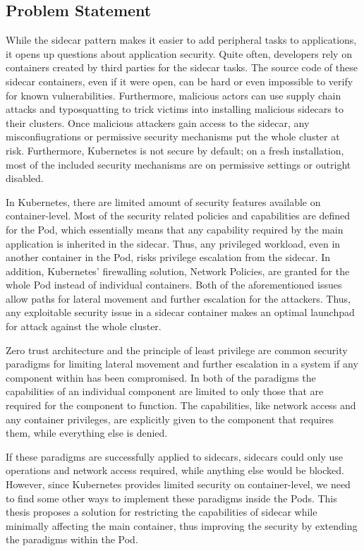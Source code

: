 \documentclass[english, 12pt, a4paper, sci, utf8, a-2b, online]{aaltothesis}
\begin{document}
\subsection{Problem Statement}

While the sidecar pattern makes it easier to add peripheral tasks to applications, it opens up questions about application security. Quite often, developers rely on containers created by third parties for the sidecar tasks. The source code of these sidecar containers, even if it were open, can be hard or even impossible to verify for known vulnerabilities. Furthermore, malicious actors can use supply chain attacks and typosquatting to trick victims into installing malicious sidecars to their clusters. Once malicious attackers gain access to the sidecar, any misconfiugrations or permissive security mechanisms put the whole cluster at risk. Furthermore, Kubernetes is not secure by default; on a fresh installation, most of the included security mechanisms are on permissive settings or outright disabled.

In Kubernetes, there are limited amount of security features available on container-level. Most of the security related policies and capabilities are defined for the Pod, which essentially means that any capability required by the main application is inherited in the sidecar. Thus, any privileged workload, even in another container in the Pod, risks privilege escalation from the sidecar. In addition, Kubernetes' firewalling solution, Network Policies, are granted for the whole Pod instead of individual containers. Both of the aforementioned issues allow paths for lateral movement and further escalation for the attackers. Thus, any exploitable security issue in a sidecar container makes an optimal launchpad for attack against the whole cluster.

Zero trust architecture and the principle of least privilege are common security paradigms for limiting lateral movement and further escalation in a system if any component within has been compromised. In both of the paradigms the capabilities of an individual component are limited to only those that are required for the component to function. The capabilities, like network access and any container privileges, are explicitly given to the component that requires them, while everything else is denied.

If these paradigms are successfully applied to sidecars, sidecars could only use operations and network access required, while anything else would be blocked. However, since Kubernetes provides limited security on container-level, we need to find some other ways to implement these paradigms inside the Pods. This thesis proposes a solution for restricting the capabilities of sidecar while minimally affecting the main container, thus improving the security by extending the paradigms within the Pod.
\end{document}
